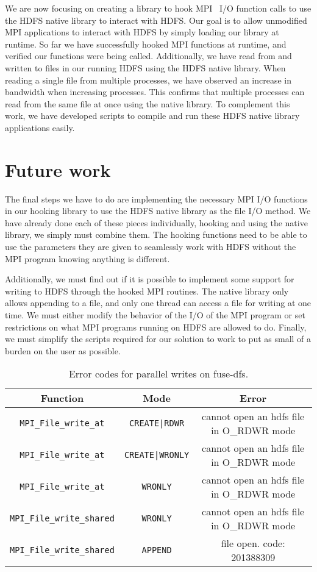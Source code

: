 \documentclass[11pt,titlepage]{article}
\newcommand{\otoprule}{\midrule[\heavyrulewidth]}
\begin{document}
We are now focusing on creating a library to 
hook MPI~\cite{mpich} I/O function calls to use the HDFS native library to interact with
HDFS. Our goal is to allow 
unmodified MPI applications to interact with HDFS by simply loading our library
at runtime. 
So far we have successfully hooked MPI functions at runtime, and verified our
functions were being 
called. Additionally, we have read from and written to files in our running HDFS
using the HDFS native 
library. When reading a single file from multiple processes, we have observed an
increase in bandwidth 
when increasing processes. This confirms that multiple processes can read from the
same file at once using 
the native library. To complement this work, we have developed scripts to
compile and run these HDFS 
native library applications easily.

\section{Future work}
The final steps we have to do are implementing the necessary MPI I/O functions
in our hooking library to 
use the HDFS native library as the file I/O method. We have already done each of
these pieces 
individually, hooking and using the native library, we simply must combine them.
The hooking functions 
need to be able to use the parameters they are given to seamlessly work with
HDFS without the MPI 
program knowing anything is different. 

Additionally, we must find out if it is possible to implement some support for
writing to HDFS through 
the hooked MPI routines. The native library only allows appending to a file, and
only one thread can 
access a file for writing at one time. We must either modify the behavior of the
I/O of the MPI program 
or set restrictions on what MPI programs running on HDFS are allowed to do.
Finally, we must simplify 
the scripts required for our solution to work to put as small of a burden on the
user as possible.

\begin{table}[t]
	\centering
	\small
	\begin{tabular}{ccc}
		\toprule
	{\bf Function} &{\bf Mode} &{\bf Error} \\\otoprule
		{\tt MPI\_File\_write\_at} & {\tt CREATE|RDWR} & cannot open an
		hdfs file in O\_RDWR mode \\
		{\tt MPI\_File\_write\_at} & {\tt CREATE|WRONLY} & cannot open an
		hdfs file in O\_RDWR mode \\
		{\tt MPI\_File\_write\_at} & {\tt WRONLY} & cannot open an
		hdfs file in O\_RDWR mode \\
		{\tt MPI\_File\_write\_shared} & {\tt WRONLY} & cannot open an
		hdfs file in O\_RDWR mode \\
		{\tt MPI\_File\_write\_shared} & {\tt APPEND} &file open. code:
		201388309\\\bottomrule 
	\end{tabular}
	\caption{\small Error codes for parallel writes on fuse-dfs.}
	\label{tab:write}
\end{table}
{}

\end{document}
